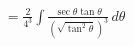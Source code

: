 \documentclass[preview]{standalone}
\begin{document}
\begin{align*}
&=\frac{2}{4^3} \int \frac{\sec\theta\tan\theta}{(\sqrt{\tan^2\theta})^3} \, d\theta \\
\end{align*}
\end{document}

